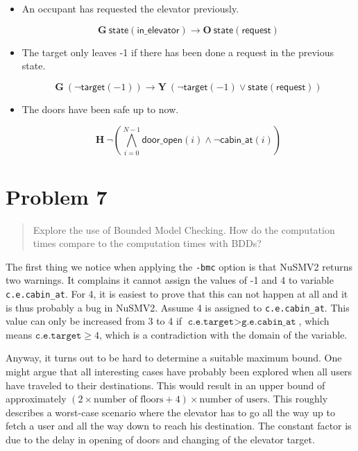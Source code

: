 \documentclass[a4paper,10pt]{article}
\newcommand{\LTLG}{\mathbf{G~}}
\newcommand{\LTLO}{\mathbf{O~}}
\newcommand{\LTLY}{\mathbf{Y~}}
\newcommand{\LTLH}{\mathbf{H~}}
\newcommand{\conjall}[2]{\mathop{\bigwedge}\limits_{#1}^{#2}}
\newcommand{\dooropen}[1]{\mathsf{door\_open}(#1)}
\newcommand{\cabinat}[1]{\mathsf{cabin\_at}(#1)}
\newcommand{\target}[1]{\mathsf{target}(#1)}
\newcommand{\state}[1]{\mathsf{state}(\mathsf{#1})}
\newcommand{\imply}{\rightarrow}
\begin{document}
	\begin{itemize}
		\item
			An occupant has requested the elevator previously.
		
			\[
				\LTLG \state{in\_elevator} \imply \LTLO \state{request}
			\]
		
		\item
			The target only leaves -1 if there has been done a request in the previous state.
			
			\[
				\LTLG (\neg \target{-1}) \imply \LTLY (\neg \target{-1} \vee \state{request})
			\]
		
		\item
			The doors have been safe up to now.
			
			\[
				\LTLH \neg \left( \conjall{i=0}{N-1} \dooropen{i} \wedge \neg \cabinat{i} \right)
			\]
	\end{itemize}
	
	\section{Problem 7}
	
	\begin{quote}
		Explore the use of Bounded Model Checking. How do the computation times compare to the computation times with BDDs?
	\end{quote}

	
	The first thing we notice when applying the \texttt{-bmc} option is that NuSMV2 returns two warnings. It complains it cannot assign the values of -1 and 4 to variable \texttt{c.e.cabin\_at}. For 4, it is easiest to prove that this can not happen at all and it is thus probably a bug in NuSMV2. Assume 4 is assigned to \texttt{c.e.cabin\_at}. This value can only be increased from 3 to 4 if \(\texttt{c.e.target} > \texttt{g.e.cabin\_at}\), which means \(\texttt{c.e.target} \ge 4\), which is a contradiction with the domain of the variable.
	
	Anyway, it turns out to be hard to determine a suitable maximum bound. One might argue that all interesting cases have probably been explored when all users have traveled to their destinations. This would result in an upper bound of approximately \((2 \times \textrm{number of floors} + 4) \times \textrm{number of users}\). This roughly describes a worst-case scenario where the elevator has to go all the way up to fetch a user and all the way down to reach his destination. The constant factor is due to the delay in opening of doors and changing of the elevator target.
	
\end{document}
